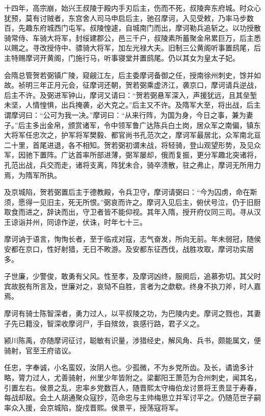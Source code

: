 \documentclass[]{article}
\begin{document}
十四年，高宗崩，始兴王叔陵于殿内手刃后主，伤而不死，叔陵奔东府城。时众心犹预，莫有讨贼者，东宫舍人司马申启后主，驰召摩诃，入见受敕，乃率马步数百，先趣东府城西门屯军。叔陵惶遽，自城南门而出，摩诃勒兵追斩之。以功授散骑常侍、车骑大将军，封绥建郡公，邑三千户，叔陵素所蓄聚金帛累巨万，后主悉以赐之。寻改授侍中、骠骑大将军，加左光禄大夫。旧制三公黄阁听事置鸱尾，后主特赐摩诃开黄阁，门施行马，听事寝堂并置鸱尾。仍以其女为皇太子妃。

会隋总管贺若弼镇广陵，窥觎江左，后主委摩诃备御之任，授南徐州刺史，馀并如故。祯明三年正月元会，征摩诃还朝，贺若弼乘虚济江，袭京口，摩诃请兵逆战，后主不许。及弼进军钟山，摩诃又请曰：``贺若弼悬军深入，声援犹远，且其垒堑未坚，人情惶惧，出兵掩袭，必大克之。''后主又不许。及隋军大至，将出战，后主谓摩诃曰：``公可为我一决。''摩诃曰：``从来行阵，为国为身，今日之事，兼为妻子。''后主多出金帛，颁赏诸军，令中领军鲁广达陈兵白土岗，居众军之南偏，镇东大将军任忠次之，护军将军樊毅、都官尚书孔范次之，摩诃军最居北，众军南北亘二十里，首尾进退，各不相知。贺若弼初谓未战，将轻骑，登山观望形势，及见众军，因驰下置阵。广达首率所部进薄，弼军屡却，俄而复振，更分军趣北突诸将，孔范出战，兵交而走，诸将支离，阵犹未合，骑卒溃散，驻之弗止，摩诃无所用力焉，为隋军所执。

及京城陷，贺若弼置后主于德教殿，令兵卫守，摩诃请弼曰：``今为囚虏，命在斯须，愿得一见旧主，死无所恨。''弼哀而许之。摩诃入见后主，俯伏号泣，仍于旧厨取食而进之，辞诀而出，守卫者皆不能仰视。其年入隋，授开府仪同三司。寻从汉王谅诣并州，同谅作逆，伏诛，时年七十三。

摩诃讷于语言，恂恂长者，至于临戎对寇，志气奋发，所向无前。年未弱冠，随侯安都在京口，性好射猎，无日不畋游。及安都东征西伐，战胜攻取，摩诃功实居多。

子世廉，少警俊，敢勇有父风。性至孝，及摩诃凶终，服阕后，追慕弥切。其父时宾故脱有所言及，世廉对之，哀恸不自胜，言者为之歔欷。终身不执刀斧，时人嘉焉。

摩诃有骑士陈智深者，勇力过人，以平叔陵之功，为巴陵内史。摩诃之戮也，其妻子先已籍没，智深收摩诃尸，手自殡敛，哀感行路，君子义之。

颍川陈禹，亦随摩诃征讨，聪敏有识量，涉猎经史，解风角、兵书，颇能属文，便骑射，官至王府谘议。

任忠，字奉诚，小名蛮奴，汝阴人也。少孤微，不为乡党所齿。及长，谲诡多计略，膂力过人，尤善骑射，州里少年皆附之。梁鄱阳王萧范为合州刺史，闻其名，引置左右。侯景之乱，忠率乡党数百人，随晋熙太守梅伯龙讨景将王贵显于寿春，每战却敌。会土人胡通聚众寇抄，范命忠与主帅梅思立并军讨平之。仍随范世子嗣率众入援，会京城陷，旋戍晋熙。侯景平，授荡寇将军。
\end{document}
